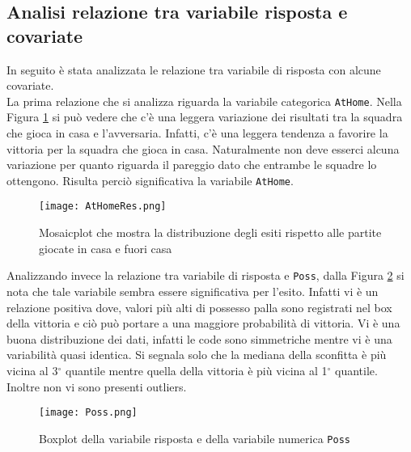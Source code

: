 \subsection{Analisi relazione tra variabile risposta e covariate}
In seguito è stata analizzata le relazione tra variabile di risposta con alcune covariate.\\

La prima relazione che si analizza riguarda la variabile categorica \texttt{AtHome}. Nella Figura \ref{fig:AtHome} si può vedere che c'è una leggera variazione dei risultati tra la squadra che gioca in casa e l'avversaria. Infatti, c'è una leggera tendenza a favorire la vittoria per la squadra che gioca in casa. Naturalmente non deve esserci alcuna variazione per quanto riguarda il pareggio dato che entrambe le squadre lo ottengono. Risulta perciò significativa la variabile \texttt{AtHome}.\\

\begin{figure}[htbp]
	\begin{center}
		\texttt{[image: AtHomeRes.png]}
		\caption{Mosaicplot che mostra la distribuzione degli esiti rispetto alle partite giocate in casa e fuori casa} \label{fig:AtHome}
	\end{center}
\end{figure}

Analizzando invece la relazione tra variabile di risposta e \texttt{Poss}, dalla Figura \ref{fig:Poss} si nota che tale variabile sembra essere significativa per l'esito. Infatti vi è un relazione positiva dove, valori più alti di possesso palla sono registrati nel box della vittoria e ciò può portare a una maggiore probabilità di vittoria. Vi è una buona distribuzione dei dati, infatti le code sono simmetriche mentre vi è una variabilità quasi identica. Si segnala solo che la mediana della sconfitta è più vicina al 3$^{\circ}$ quantile mentre quella della vittoria è più vicina al 1$^{\circ}$ quantile. Inoltre non vi sono presenti outliers.\\

\begin{figure}[htbp]
	\begin{center}
		\texttt{[image: Poss.png]}
		\caption{Boxplot della variabile risposta e della variabile numerica \texttt{Poss} } \label{fig:Poss}
	\end{center}
\end{figure}

